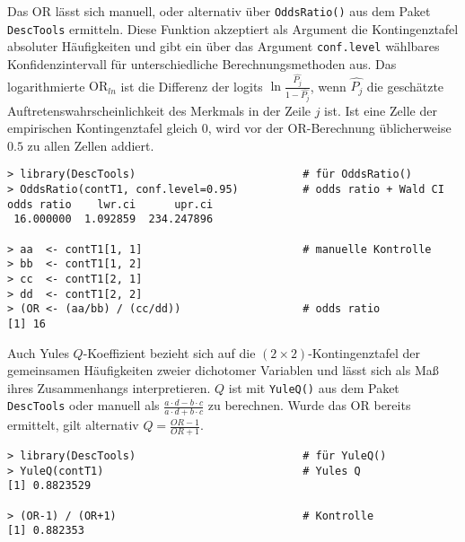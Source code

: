 Das OR lässt sich manuell, oder alternativ über \lstinline!OddsRatio()! aus dem Paket \lstinline!DescTools! ermitteln. Diese Funktion akzeptiert als Argument die Kontingenztafel absoluter Häufigkeiten und gibt ein über das Argument \lstinline!conf.level! wählbares Konfidenzintervall für unterschiedliche Berechnungsmethoden aus. Das logarithmierte $\text{OR}_{ln}$ ist die Differenz der logits $\ln \frac{\hat{P_{j}}}{1-\hat{P_{j}}}$, wenn $\hat{P_{j}}$ die geschätzte Auftretenswahrscheinlichkeit des Merkmals in der Zeile $j$ ist. Ist eine Zelle der empirischen Kontingenztafel gleich $0$, wird vor der OR-Berechnung üblicherweise $0.5$ zu allen Zellen addiert.
\begin{lstlisting}
> library(DescTools)                          # für OddsRatio()
> OddsRatio(contT1, conf.level=0.95)          # odds ratio + Wald CI
odds ratio    lwr.ci      upr.ci
 16.000000  1.092859  234.247896

> aa  <- contT1[1, 1]                         # manuelle Kontrolle
> bb  <- contT1[1, 2]
> cc  <- contT1[2, 1]
> dd  <- contT1[2, 2]
> (OR <- (aa/bb) / (cc/dd))                   # odds ratio
[1] 16
\end{lstlisting}

%
%

Auch Yules $Q$-Koeffizient bezieht sich auf die $(2 \times 2)$-Kontingenztafel der gemeinsamen Häufigkeiten zweier dichotomer Variablen und lässt sich als Maß ihres Zusammenhangs interpretieren. $Q$ ist mit \lstinline!YuleQ()! aus dem Paket \lstinline!DescTools! oder manuell als $\frac{a \cdot d - b \cdot c}{a \cdot d + b \cdot c}$ zu berechnen. Wurde das OR bereits ermittelt, gilt alternativ $Q = \frac{OR-1}{OR+1}$.
\begin{lstlisting}
> library(DescTools)                          # für YuleQ()
> YuleQ(contT1)                               # Yules Q
[1] 0.8823529

> (OR-1) / (OR+1)                             # Kontrolle
[1] 0.882353
\end{lstlisting}

